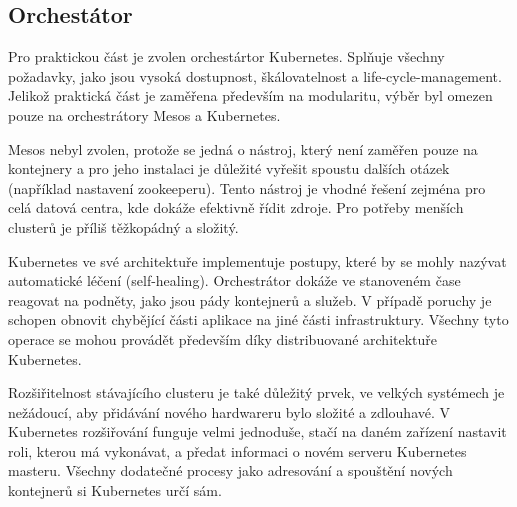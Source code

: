 \subsection{Orchestátor}
Pro praktickou část je zvolen orchestártor Kubernetes. Splňuje všechny požadavky, jako jsou vysoká dostupnost, škálovatelnost a life-cycle-management. Jelikož praktická část je zaměřena především na modularitu, výběr byl omezen pouze na orchestrátory Mesos a Kubernetes. 

Mesos nebyl zvolen, protože se jedná o nástroj, který není zaměřen pouze na kontejnery a pro jeho instalaci je důležité vyřešit spoustu dalších otázek (například nastavení zookeeperu). Tento nástroj je vhodné řešení zejména pro celá datová centra, kde dokáže efektivně řídit zdroje. Pro potřeby menších clusterů je příliš těžkopádný a složitý.

Kubernetes ve své architektuře implementuje postupy, které by se mohly nazývat automatické léčení (self-healing). Orchestrátor dokáže ve stanoveném čase reagovat na podněty, jako jsou pády kontejnerů a služeb. V případě poruchy je schopen obnovit chybějící části aplikace na jiné části infrastruktury. Všechny tyto operace se mohou provádět především díky  distribuované architektuře Kubernetes. 

Rozšiřitelnost stávajícího clusteru je také důležitý prvek, ve velkých systémech je nežádoucí, aby přidávání nového hardwareru bylo složité a zdlouhavé. V Kubernetes rozšiřování funguje velmi jednoduše, stačí na daném zařízení nastavit roli, kterou má vykonávat, a předat informaci o novém serveru Kubernetes masteru. Všechny dodatečné procesy jako adresování a spouštění nových kontejnerů si Kubernetes určí sám. 
